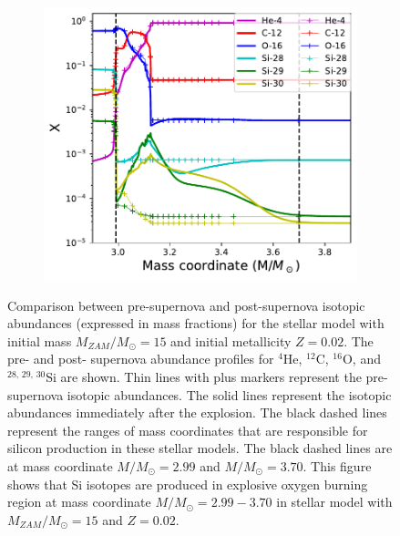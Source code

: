 \documentclass{brandeis-thesis3.2}
\def \msun {M_{\odot}}
\newcommand{\iso}[2]{$^{#1}${#2}}
\begin{document}
\begin{figure}[H]
    \centering
    \begin{subfigure}[c]{0.6\textwidth}
        \includegraphics[width=\textwidth]{figs/150.02.pdf}
    \end{subfigure}
    \caption{Comparison between pre-supernova and post-supernova isotopic abundances (expressed in mass fractions) for the stellar model with initial mass $M_{ZAM}/\msun =15$ and initial metallicity $Z=0.02$. The pre- and post- supernova abundance profiles for \iso{4}{He}, \iso{12}{C}, \iso{16}{O}, and \iso{28,\, 29,\, 30}{Si} are shown. Thin lines with plus markers represent the pre-supernova isotopic abundances. The solid lines represent the isotopic abundances immediately after the explosion. The black dashed lines represent the ranges of mass coordinates that are responsible for silicon production in these stellar models. The black dashed lines are at mass coordinate $M/\msun = 2.99$ and $M/\msun = 3.70$. This figure shows that Si isotopes are produced in explosive oxygen burning region at mass coordinate $M/\msun = 2.99-3.70$ in stellar model with $M_{ZAM}/\msun =15$ and $Z=0.02$.}
    \label{fig:m15z02}
\end{figure}
\end{document}
